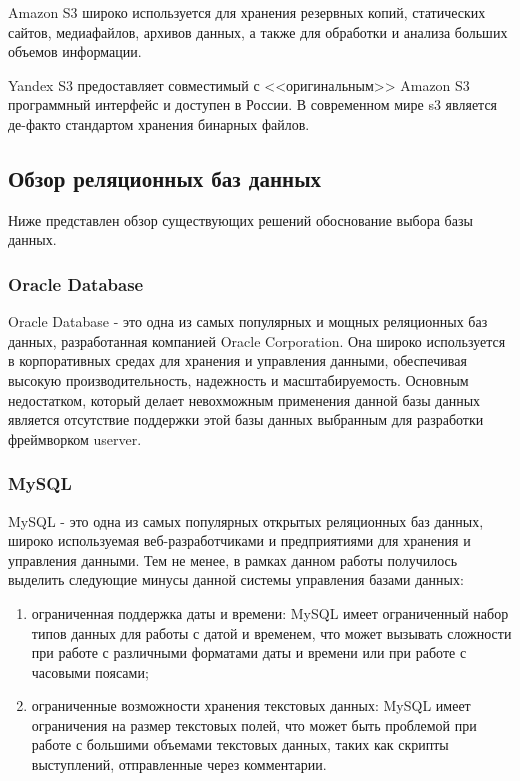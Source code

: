 Amazon S3 широко используется для хранения резервных копий, статических сайтов, медиафайлов, архивов данных, а также для обработки и анализа больших объемов информации.

Yandex S3 предоставляет совместимый с <<оригинальным>> Amazon S3 программный интерфейс и доступен в России. В современном мире s3 является де-факто стандартом хранения бинарных файлов.


\subsection{Обзор реляционных баз данных}

Ниже представлен обзор существующих решений обоснование выбора базы данных.

\subsubsection{Oracle Database}

Oracle Database - это одна из самых популярных и мощных реляционных баз данных, разработанная компанией Oracle Corporation. Она широко используется в корпоративных средах для хранения и управления данными, обеспечивая высокую производительность, надежность и масштабируемость. Основным недостатком, который делает невохможным применения данной базы данных является отсутствие поддержки этой базы данных выбранным для разработки фреймворком userver.


\subsubsection{MySQL}

MySQL - это одна из самых популярных открытых реляционных баз данных, широко используемая веб-разработчиками и предприятиями для хранения и управления данными. Тем не менее, в рамках данном работы получилось выделить следующие минусы данной системы управления базами данных: 

\begin{enumerate}
	\item ограниченная поддержка даты и времени: MySQL имеет ограниченный набор типов данных для работы с датой и временем, что может вызывать сложности при работе с различными форматами даты и времени или при работе с часовыми поясами;
	\item ограниченные возможности хранения текстовых данных: MySQL имеет ограничения на размер текстовых полей, что может быть проблемой при работе с большими объемами текстовых данных, таких как скрипты выступлений, отправленные через комментарии.
\end{enumerate}

